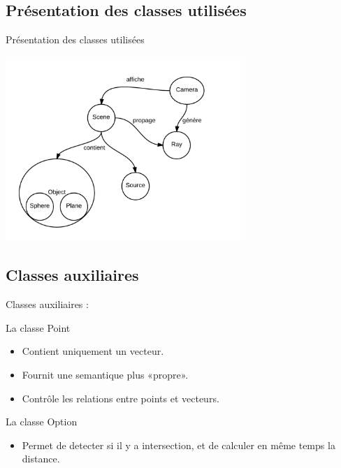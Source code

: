 \documentclass{beamer}
\begin{document}
	\subsection{Présentation des classes utilisées}
	\begin{frame}{Présentation des classes utilisées}
		\begin{center}
    		\includegraphics[height = 7cm]{schema.png}
  		\end{center}
	\end{frame}	

	\subsection{Classes auxiliaires}
	\begin{frame}
		Classes auxiliaires : 
		\begin{block}{La classe Point} 
			\begin{itemize}
				\item Contient uniquement un vecteur.
				\item Fournit une semantique plus «propre».
				\item Contrôle les relations entre points et vecteurs.
			\end{itemize}
		\end{block} \pause

		\begin{block}{La classe Option}
			\begin{itemize}
				\item Permet de detecter si il y a intersection, et de calculer en même temps la distance.
			\end{itemize}
		\end{block}
	\end{frame}
	
\end{document}
